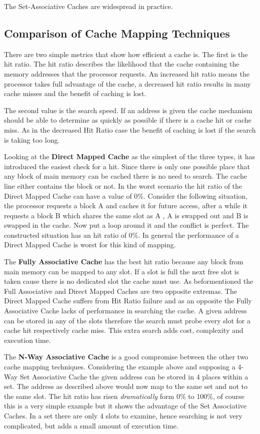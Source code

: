 \documentclass[DIV10, abstracton, openright, footsepline, headsepline, twoside, 9pt,
bigheadings]{scrreprt}
\begin{document}
The Set-Associative Caches are widespread in practice.

\subsection{Comparison of Cache Mapping Techniques}
\label{sec:comparison_dmc}
There are two simple metrics that show how efficient a cache is. The first is
the hit ratio. The hit ratio describes the likelihood that the cache containing
the memory addresses that the processor requests. An increased hit ratio means
the processor takes full advantage of the cache, a decreased hit ratio results
in many cache misses and the benefit of caching is lost.

The second value is the search speed. If an address is given the cache
mechanism should be able to determine as quickly as possible if there is a cache
hit or cache miss. As in the decreased Hit Ratio case the benefit of caching is
lost if the search is taking too long.

Looking at the \textbf{Direct Mapped Cache} as the simplest of the three types,
it has introduced the easiest check for a hit. Since there is only one
possible place that any block of main memory can be cached there is no need to
search. The cache line either contains the block or not. In the worst scenario
the hit ratio of the Direct Mapped Cache can have a value of 0\%. Consider the
following situation, the processor requests a block A and caches it for future
access, after a while it requests a block B which shares the same slot as A , A
is swapped out and B is swapped in the cache. Now put a loop around it and the
conflict is perfect. The constructed situation has an hit ratio of 0\%. In
general the performance of a Direct Mapped Cache is worst for this kind of
mapping.

The \textbf{Fully Associative Cache} has the best hit ratio because any block
from main memory can be mapped to any slot. If a slot is full the next free slot
is taken cause there is no dedicated slot the cache must use. As beformentioned
the Full Associative and Direct Mapped Caches are two opposite extremas. The
Direct Mapped Cache suffers from Hit Ratio failure and as an opposite the Fully
Associative Cache lacks of performance in searching the cache. A given address
can be stored in any of the slots therefore the search must probe every slot
for a cache hit respectively cache miss. This extra search adds cost, complexity
and execution time.

The \textbf{N-Way Associative Cache} is a good compromise between the other two
cache mapping techniques. Considering the example above and supposing a 4-Way
Set Associative Cache the given address can be stored in 4 places within a set.
The address as described above would now map to the same set and not to the
same slot. The hit ratio has risen \textit{dramatically} form 0\% to 100\%, of
course this is a very simple example but it shows the advantage of the Set
Associative Caches. In a set there are only 4 slots to examine, hence searching
is not very complicated, but adds a small amount of execution time.
\end{document}
